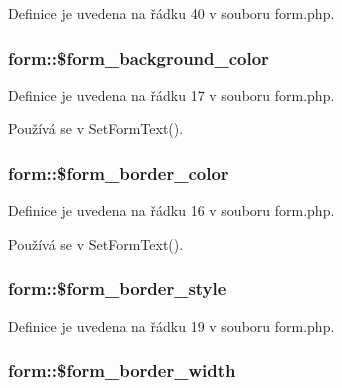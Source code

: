 Definice je uvedena na řádku 40 v souboru form.\-php.

\hypertarget{classform_aef0107c96ce2b45b0c635acf0d78dddb}{
\subsubsection[{\$form\-\_\-background\-\_\-color}]{\setlength{\rightskip}{0pt plus 5cm}form\-::\$form\-\_\-background\-\_\-color}}\label{classform_aef0107c96ce2b45b0c635acf0d78dddb}


Definice je uvedena na řádku 17 v souboru form.\-php.



Používá se v Set\-Form\-Text().

\hypertarget{classform_a12bafecc5132d5cc48675eb4e5b13d57}{
\subsubsection[{\$form\-\_\-border\-\_\-color}]{\setlength{\rightskip}{0pt plus 5cm}form\-::\$form\-\_\-border\-\_\-color}}\label{classform_a12bafecc5132d5cc48675eb4e5b13d57}


Definice je uvedena na řádku 16 v souboru form.\-php.



Používá se v Set\-Form\-Text().

\hypertarget{classform_a8d7da4c8e9d816b67fd5398d8ba4968e}{
\subsubsection[{\$form\-\_\-border\-\_\-style}]{\setlength{\rightskip}{0pt plus 5cm}form\-::\$form\-\_\-border\-\_\-style}}\label{classform_a8d7da4c8e9d816b67fd5398d8ba4968e}


Definice je uvedena na řádku 19 v souboru form.\-php.

\hypertarget{classform_a00cb11df90b366c403346416d9d6c98e}{
\subsubsection[{\$form\-\_\-border\-\_\-width}]{\setlength{\rightskip}{0pt plus 5cm}form\-::\$form\-\_\-border\-\_\-width}}\label{classform_a00cb11df90b366c403346416d9d6c98e}


